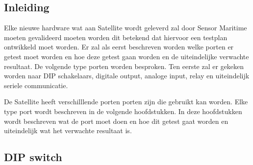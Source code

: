 \subsection{Inleiding}
Elke nieuwe hardware wat aan Satellite wordt geleverd zal door Sensor Maritime moeten gevalideerd moeten worden dit betekend dat hiervoor een testplan ontwikkeld moet worden. Er zal als eerst beschreven worden welke porten er getest moet worden en hoe deze getest gaan worden en de uiteindelijke verwachte resultaat. De volgende type porten worden besproken. Ten eerste zal er gekeken worden naar DIP schakelaars, digitale output, analoge input, relay en uiteindelijk seriele communicatie. \newline

\noindent De Satellite heeft verschilllende porten porten zijn die gebruikt kan worden. Elke type port wordt beschreven in de volgende hoofdstukken. In deze hoofdstukken wordt beschreven wat de port moet doen en hoe dit getest gaat worden en uiteindelijk wat het verwachte resultaat is.

\subsection{DIP switch}
